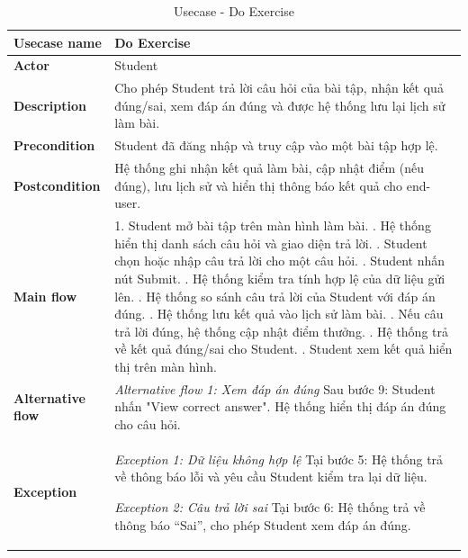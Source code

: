 \begin{table}[H]
  \centering
  \renewcommand{\arraystretch}{1.3}
  \begin{tabular}{|l|p{}|}
    \hline
    \textbf{Usecase name} & Do Exercise \\ \hline

    \textbf{Actor} & Student \\ \hline

    \textbf{Description} & 
    Cho phép Student trả lời câu hỏi của bài tập, nhận kết quả đúng/sai, xem đáp án đúng và được hệ thống lưu lại lịch sử làm bài. \\ \hline

    \textbf{Precondition} & 
    Student đã đăng nhập và truy cập vào một bài tập hợp lệ. \\ \hline

    \textbf{Postcondition} & 
    Hệ thống ghi nhận kết quả làm bài, cập nhật điểm (nếu đúng), lưu lịch sử và hiển thị thông báo kết quả cho end-user. \\ \hline

    \textbf{Main flow} &
    1. Student mở bài tập trên màn hình làm bài. \newline
    2. Hệ thống hiển thị danh sách câu hỏi và giao diện trả lời. \newline
    3. Student chọn hoặc nhập câu trả lời cho một câu hỏi. \newline
    4. Student nhấn nút Submit. \newline
    5. Hệ thống kiểm tra tính hợp lệ của dữ liệu gửi lên. \newline
    6. Hệ thống so sánh câu trả lời của Student với đáp án đúng. \newline
    7. Hệ thống lưu kết quả vào lịch sử làm bài. \newline
    8. Nếu câu trả lời đúng, hệ thống cập nhật điểm thưởng. \newline
    9. Hệ thống trả về kết quả đúng/sai cho Student. \newline
    10. Student xem kết quả hiển thị trên màn hình. \\ \hline

    \textbf{Alternative flow} &
    \textit{Alternative flow 1: Xem đáp án đúng} \newline
    Sau bước 9: Student nhấn "View correct answer". \newline
    Hệ thống hiển thị đáp án đúng cho câu hỏi. \\ \hline

    \textbf{Exception} &
    \textit{Exception 1: Dữ liệu không hợp lệ} \newline
    Tại bước 5: Hệ thống trả về thông báo lỗi và yêu cầu Student kiểm tra lại dữ liệu. \newline\newline

    \textit{Exception 2: Câu trả lời sai} \newline
    Tại bước 6: Hệ thống trả về thông báo “Sai”, cho phép Student xem đáp án đúng. \\ \hline
  \end{tabular}
  \caption{Usecase - Do Exercise}
  \label{table:uc_acc02}
\end{table}
